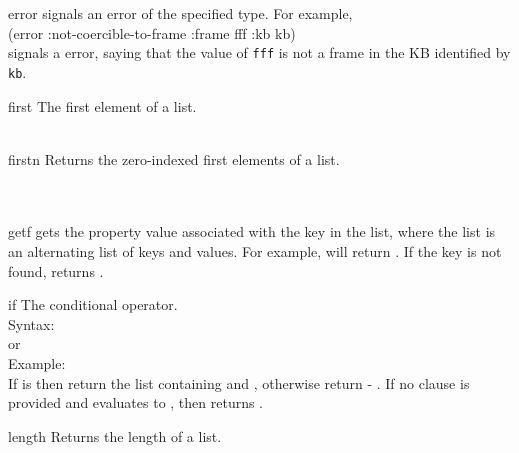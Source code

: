 \begin{okbcfspec}{error}
 signals an error of the
specified type.  For example,\\
(error :not-coercible-to-frame :frame fff :kb kb)\\
signals a  error, saying that the value of
{\tt fff} is not a frame in the KB identified by {\tt kb}.
\end{okbcfspec}

\begin{okbcfspec}{first}
The first element of a list.\\
\\
\end{okbcfspec}

\begin{okbcfspec}{firstn}
Returns the zero-indexed first  elements of a list.\\
\\
\\
\end{okbcfspec}

\begin{okbcfspec}{getf}
 gets the property value
associated
with the key in the list, where the list is an alternating
list of keys and values.
For example, 
will return .  If the key is not found,
returns .
\end{okbcfspec}

\begin{okbcfspec}{if}
The conditional operator.\\
Syntax: \\
or      \\
Example: \\
If  is  then return the list
containing  and ,
otherwise return  - .
If no  clause is
provided and  evaluates to ,
then returns .
\end{okbcfspec}

\begin{okbcfspec}{length}
Returns the length of a list.\\
\\
\end{okbcfspec}

